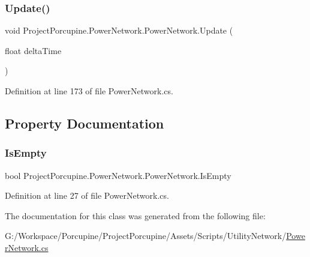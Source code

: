 \subsubsection{\texorpdfstring{Update()}{Update()}}
{\footnotesize\ttfamily void Project\+Porcupine.\+Power\+Network.\+Power\+Network.\+Update (\begin{DoxyParamCaption}\item[{float}]{delta\+Time }\end{DoxyParamCaption})}



Definition at line 173 of file Power\+Network.\+cs.



\subsection{Property Documentation}
\mbox{\label{class_project_porcupine_1_1_power_network_1_1_power_network_a9f24883e16e785a1737592f523d1c18d}} 
\subsubsection{\texorpdfstring{Is\+Empty}{IsEmpty}}
{\footnotesize\ttfamily bool Project\+Porcupine.\+Power\+Network.\+Power\+Network.\+Is\+Empty\hspace{0.3cm}{\ttfamily [get]}}



Definition at line 27 of file Power\+Network.\+cs.



The documentation for this class was generated from the following file\+:\begin{DoxyCompactItemize}
\item 
G\+:/\+Workspace/\+Porcupine/\+Project\+Porcupine/\+Assets/\+Scripts/\+Utility\+Network/\hyperlink{_power_network_8cs}{Power\+Network.\+cs}\end{DoxyCompactItemize}
